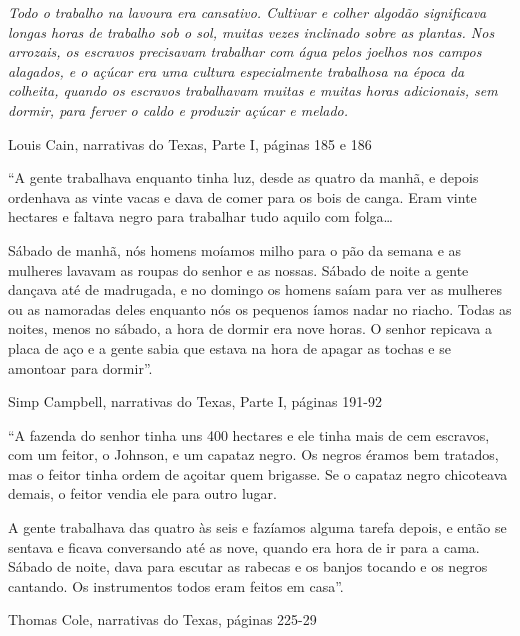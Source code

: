 \emph{Todo o trabalho na lavoura era cansativo. Cultivar e colher
algodão significava longas horas de trabalho sob o sol, muitas vezes
inclinado sobre as plantas. Nos arrozais, os escravos precisavam
trabalhar com água pelos joelhos nos campos alagados, e o açúcar era uma
cultura especialmente trabalhosa na época da colheita, quando os
escravos trabalhavam muitas e muitas horas adicionais, sem dormir, para
ferver o caldo e produzir açúcar e melado. }

Louis Cain, narrativas do Texas, Parte I, páginas 185 e 186

``A gente trabalhava enquanto tinha luz, desde as quatro da manhã, e
depois ordenhava as vinte vacas e dava de comer para os bois de canga.
Eram vinte hectares e faltava negro para trabalhar tudo aquilo com
folga\ldots{}

Sábado de manhã, nós homens moíamos milho para o pão da semana e as
mulheres lavavam as roupas do senhor e as nossas. Sábado de noite a
gente dançava até de madrugada, e no domingo os homens saíam para ver as
mulheres ou as namoradas deles enquanto nós os pequenos íamos nadar no
riacho. Todas as noites, menos no sábado, a hora de dormir era nove
horas. O senhor repicava a placa de aço e a gente sabia que estava na
hora de apagar as tochas e se amontoar para dormir''.

Simp Campbell, narrativas do Texas, Parte I, páginas 191-92

``A fazenda do senhor tinha uns 400 hectares e ele tinha mais de cem
escravos, com um feitor, o Johnson, e um capataz negro. Os negros éramos
bem tratados, mas o feitor tinha ordem de açoitar quem brigasse. Se o
capataz negro chicoteava demais, o feitor vendia ele para outro lugar.

A gente trabalhava das quatro às seis e fazíamos alguma tarefa depois, e
então se sentava e ficava conversando até as nove, quando era hora de ir
para a cama. Sábado de noite, dava para escutar as rabecas e os banjos
tocando e os negros cantando. Os instrumentos todos eram feitos em
casa''.

Thomas Cole, narrativas do Texas, páginas 225-29

